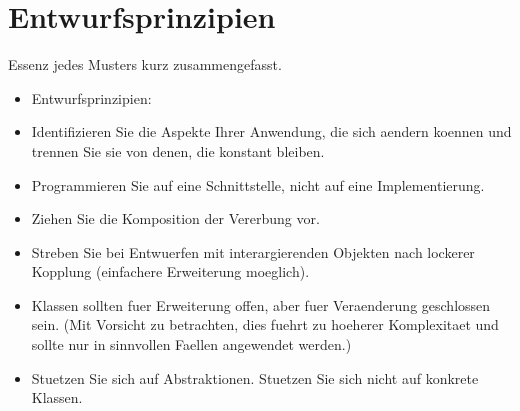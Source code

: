 \section{Entwurfsprinzipien}
Essenz jedes Musters kurz zusammengefasst. 

\begin{itemize}[leftmargin=0.2in]
	\item Entwurfsprinzipien:
	\item Identifizieren Sie die Aspekte Ihrer Anwendung, die sich aendern koennen und trennen Sie sie 
  von denen, die konstant bleiben.
	\item Programmieren Sie auf eine Schnittstelle, nicht auf eine Implementierung.
	\item Ziehen Sie die Komposition der Vererbung vor.
	\item Streben Sie bei Entwuerfen mit interargierenden Objekten nach lockerer Kopplung (einfachere 
Erweiterung moeglich).
	\item Klassen sollten fuer Erweiterung offen, aber fuer Veraenderung geschlossen sein. (Mit Vorsicht zu 
betrachten, dies fuehrt zu hoeherer Komplexitaet und sollte nur in sinnvollen Faellen 
angewendet werden.)
	\item Stuetzen Sie sich auf Abstraktionen. Stuetzen Sie sich nicht auf konkrete Klassen.  
\end{itemize}

